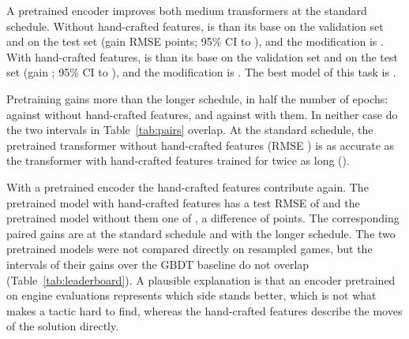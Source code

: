 \documentclass[11pt]{article}
\begin{document}
A pretrained encoder improves both medium transformers at the standard
schedule. Without hand-crafted features,
 is
 than
its base on the validation set and
 on the
test set (gain 
RMSE points; 95\% CI
 to
), and
the modification is
. With
hand-crafted features,  is
than its base on the validation set and
on the test set (gain
;
95\% CI
to
),
and the modification is
.
The best model of this task is .

\ifchangeepochs
Pretraining gains more than the longer schedule, in half the number of
epochs: 
against  without
hand-crafted features, and
against 
with them. In neither case do the two intervals in Table~\ref{tab:pairs}
overlap. At the standard schedule, the pretrained transformer without
hand-crafted features (RMSE ) is
as accurate as the transformer with hand-crafted features trained for twice
as long ().

With a pretrained encoder the hand-crafted features contribute again. The
pretrained model with hand-crafted features has a test RMSE of
 and the pretrained model
without them one of , a
difference of  points.
The corresponding paired gains are
 at the standard
schedule and
 with the
longer schedule. The two pretrained models were not compared directly on
resampled games, but the intervals of their gains over the GBDT baseline do
not overlap (Table~\ref{tab:leaderboard}). A plausible explanation is that an
encoder pretrained on engine evaluations represents which side stands better,
which is not what makes a tactic hard to find, whereas the hand-crafted
features describe the moves of the solution directly.
\fi
\end{document}
